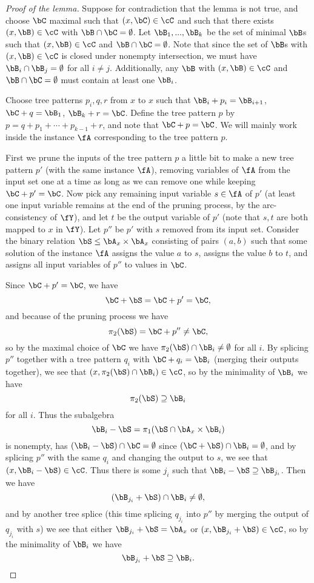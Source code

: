 \begin{proof}[Proof of the lemma] Suppose for contradiction that the lemma is not true, and choose $\bC$ maximal such that $(x,\bC) \in \cC$ and such that there exists $(x,\bB) \in \cC$ with $\bB \cap \bC = \emptyset$. Let $\bB_1, ..., \bB_k$ be the set of minimal $\bB$s such that $(x,\bB) \in \cC$ and $\bB \cap \bC = \emptyset$. Note that since the set of $\bB$s with $(x,\bB) \in \cC$ is closed under nonempty intersection, we must have $\bB_i \cap \bB_j = \emptyset$ for all $i \ne j$. Additionally, any $\bB$ with $(x,\bB) \in \cC$ and $\bB \cap \bC = \emptyset$ must contain at least one $\bB_i$.

Choose tree patterns $p_i, q, r$ from $x$ to $x$ such that $\bB_i + p_i = \bB_{i+1}$, $\bC + q = \bB_1$, $\bB_k + r = \bC$. Define the tree pattern $p$ by $p = q + p_1 + \cdots + p_{k-1} + r$, and note that $\bC + p = \bC$. We will mainly work inside the instance $\fA$ corresponding to the tree pattern $p$.

First we prune the inputs of the tree pattern $p$ a little bit to make a new tree pattern $p'$ (with the same instance $\fA$), removing variables of $\fA$ from the input set one at a time as long as we can remove one while keeping $\bC + p' = \bC$. Now pick any remaining input variable $s \in \fA$ of $p'$ (at least one input variable remains at the end of the pruning process, by the arc-consistency of $\fY$), and let $t$ be the output variable of $p'$ (note that $s,t$ are both mapped to $x$ in $\fY$). Let $p''$ be $p'$ with $s$ removed from its input set. Consider the binary relation $\bS \le \bA_x \times \bA_x$ consisting of pairs $(a,b)$ such that some solution of the instance $\fA$ assigns the value $a$ to $s$, assigns the value $b$ to $t$, and assigns all input variables of $p''$ to values in $\bC$.

Since $\bC + p' = \bC$, we have
\[
\bC + \bS = \bC + p' = \bC,
\]
and because of the pruning process we have
\[
\pi_2(\bS) = \bC + p'' \ne \bC,
\]
so by the maximal choice of $\bC$ we have $\pi_2(\bS) \cap \bB_i \ne \emptyset$ for all $i$. By splicing $p''$ together with a tree pattern $q_i$ with $\bC + q_i = \bB_i$ (merging their outputs together), we see that $(x,\pi_2(\bS) \cap \bB_i) \in \cC$, so by the minimality of $\bB_i$ we have
\[
\pi_2(\bS) \supseteq \bB_i
\]
for all $i$. Thus the subalgebra
\[
\bB_i - \bS = \pi_1(\bS \cap \bA_x\times \bB_i)
\]
is nonempty, has $(\bB_i-\bS) \cap \bC = \emptyset$ since $(\bC+\bS) \cap \bB_i = \emptyset$, and by splicing $p''$ with the same $q_i$ and changing the output to $s$, we see that $(x,\bB_i-\bS) \in \cC$. Thus there is some $j_i$ such that $\bB_i-\bS \supseteq \bB_{j_i}$. Then we have
\[
(\bB_{j_i} + \bS) \cap \bB_i \ne \emptyset,
\]
and by another tree splice (this time splicing $q_{j_i}$ into $p''$ by merging the output of $q_{j_i}$ with $s$) we see that either $\bB_{j_i} + \bS = \bA_x$ or $(x,\bB_{j_i} + \bS) \in \cC$, so by the minimality of $\bB_i$ we have
\[
\bB_{j_i} + \bS \supseteq \bB_i.
\]


\end{proof}
